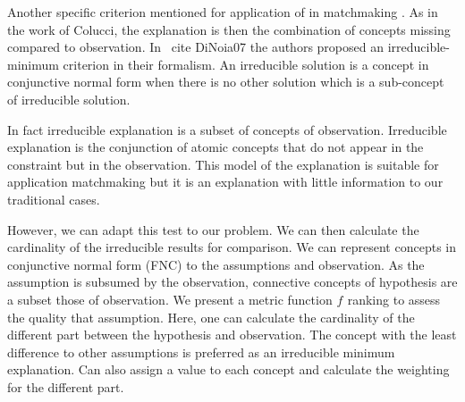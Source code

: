 \documentclass{article}
\begin{document}
Another specific criterion mentioned for application of in matchmaking \cite{}.
As in the work of Colucci, the explanation is then the combination of concepts missing compared to observation. In \ cite {DiNoia07}
the authors proposed an irreducible-minimum criterion in their formalism.
An irreducible solution is a concept in conjunctive normal form when there is no other solution which is a sub-concept of irreducible solution.

In fact irreducible explanation is a subset of concepts of observation. Irreducible explanation is the conjunction of atomic concepts
that do not appear in the constraint but in the observation.
This model of the explanation is suitable for application matchmaking but it is an explanation with little information to our traditional cases.

However, we can adapt this test to our problem. We can then calculate the cardinality of the irreducible results for comparison.
We can represent concepts in conjunctive normal form (FNC) to the assumptions and observation. As the assumption is subsumed by the observation, connective concepts of hypothesis are a subset
those of observation. We present a metric function $ f_ {} $ ranking to assess the quality that assumption. Here, one can calculate the cardinality of the different part
between the hypothesis and observation. The concept with the least difference to other assumptions is preferred as an irreducible minimum explanation. Can also
assign a value to each concept and calculate the weighting for the different part.


% 
% 
\end{document}
